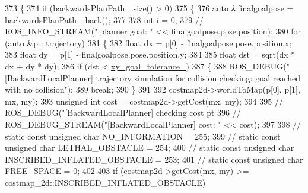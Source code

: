 \begin{DoxyCode}
{373             \{
374                 \textcolor{keywordflow}{if} (\hyperlink{classcl__move__base__z_1_1backward__local__planner_1_1BackwardLocalPlanner_ad9cde5c85f782cab2ddb4030e3c3f2cf}{backwardsPlanPath\_}.size() > 0)
375                 \{
376                     \textcolor{keyword}{auto} &finalgoalpose = \hyperlink{classcl__move__base__z_1_1backward__local__planner_1_1BackwardLocalPlanner_ad9cde5c85f782cab2ddb4030e3c3f2cf}{backwardsPlanPath\_}.back();
377 
378                     \textcolor{keywordtype}{int} i = 0;
379                     \textcolor{comment}{// ROS\_INFO\_STREAM("lplanner goal: " << finalgoalpose.pose.position);}
380                     \textcolor{keywordflow}{for} (\textcolor{keyword}{auto} &p : trajectory)
381                     \{
382                         \textcolor{keywordtype}{float} dx = p[0] - finalgoalpose.pose.position.x;
383                         \textcolor{keywordtype}{float} dy = p[1] - finalgoalpose.pose.position.y;
384 
385                         \textcolor{keywordtype}{float} dst = sqrt(dx * dx + dy * dy);
386                         \textcolor{keywordflow}{if} (dst < \hyperlink{classcl__move__base__z_1_1backward__local__planner_1_1BackwardLocalPlanner_aa4ec2c87947a3c08f8278eff052e7c8c}{xy\_goal\_tolerance\_})
387                         \{
388                             ROS\_DEBUG(\textcolor{stringliteral}{"[BackwardLocalPlanner] trajectory simulation for collision checking:
       goal reached with no collision"});
389                             \textcolor{keywordflow}{break};
390                         \}
391 
392                         costmap2d->worldToMap(p[0], p[1], mx, my);
393                         \textcolor{keywordtype}{unsigned} \textcolor{keywordtype}{int} cost = costmap2d->getCost(mx, my);
394 
395                         \textcolor{comment}{// ROS\_DEBUG("[BackwardLocalPlanner] checking cost pt %
396                         \textcolor{comment}{// ROS\_DEBUG\_STREAM("[BackwardLocalPlanner] cost: " << cost);}
397 
398                         \textcolor{comment}{// static const unsigned char NO\_INFORMATION = 255;}
399                         \textcolor{comment}{// static const unsigned char LETHAL\_OBSTACLE = 254;}
400                         \textcolor{comment}{// static const unsigned char INSCRIBED\_INFLATED\_OBSTACLE = 253;}
401                         \textcolor{comment}{// static const unsigned char FREE\_SPACE = 0;}
402 
403                         \textcolor{keywordflow}{if} (costmap2d->getCost(mx, my) >= costmap\_2d::INSCRIBED\_INFLATED\_OBSTACLE)
}}
\end{DoxyCode}
